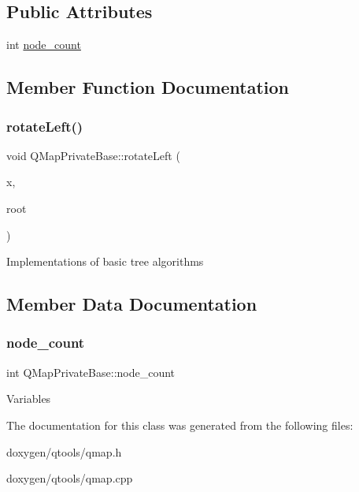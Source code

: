\subsection*{Public Attributes}
\begin{DoxyCompactItemize}
\item 
int \mbox{\hyperlink{class_q_map_private_base_a3d5fd87c3ca4b238a37d263e1ab9b0a9}{node\+\_\+count}}
\end{DoxyCompactItemize}


\subsection{Member Function Documentation}
\mbox{\label{class_q_map_private_base_adda5f2da31d0938d52b2d17ed8e5aac5}} 
\subsubsection{\texorpdfstring{rotateLeft()}{rotateLeft()}}
{\footnotesize\ttfamily void Q\+Map\+Private\+Base\+::rotate\+Left (\begin{DoxyParamCaption}\item[{\mbox{\hyperlink{struct_q_map_node_base}{Q\+Map\+Node\+Base}} $\ast$}]{x,  }\item[{\mbox{\hyperlink{struct_q_map_node_base}{Q\+Map\+Node\+Base}} $\ast$\&}]{root }\end{DoxyParamCaption})}

Implementations of basic tree algorithms 

\subsection{Member Data Documentation}
\mbox{\label{class_q_map_private_base_a3d5fd87c3ca4b238a37d263e1ab9b0a9}} 
\subsubsection{\texorpdfstring{node\_count}{node\_count}}
{\footnotesize\ttfamily int Q\+Map\+Private\+Base\+::node\+\_\+count}

Variables 

The documentation for this class was generated from the following files\+:\begin{DoxyCompactItemize}
\item 
doxygen/qtools/qmap.\+h\item 
doxygen/qtools/qmap.\+cpp\end{DoxyCompactItemize}
